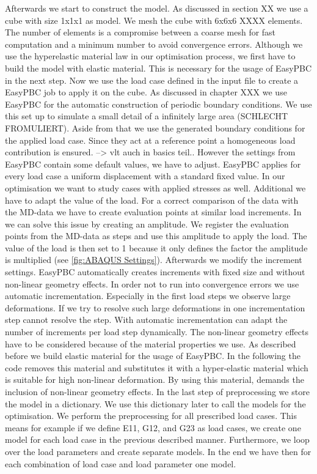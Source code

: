 Afterwards we start to construct the model. As discussed in section XX we use a cube with size 1x1x1 as model. We mesh the cube with 6x6x6 XXXX elements. The number of elements is a compromise between a coarse mesh for fast computation and a minimum number to avoid convergence errors. Although we use the hyperelastic material law in our optimisation process, we first have to build the model with elastic material. This is necessary for the usage of EasyPBC in the next step. Now we use the load case defined in the input file to create a EasyPBC job to apply it on the cube. As discussed in chapter XXX we use EasyPBC for the automatic construction of periodic boundary conditions. We use this set up to simulate a small detail of a infinitely large area (SCHLECHT FROMULIERT). Aside from that we use the generated boundary conditions for the applied load case. Since they act at a reference point a homogeneous load contribution is ensured. --> vlt auch in basics teil..
However the settings from EasyPBC contain some default values, we have to adjust. EasyPBC applies for every load case a uniform displacement with a standard fixed value. In our optimisation we want to study cases with applied stresses as well. Additional we have to adapt the value of the load. For a correct comparison of the  data with the MD-data we have to create evaluation points at similar load increments. In  we can solve this issue by creating an amplitude. We register the evaluation points from the MD-data as steps and use this amplitude to apply the load. The value of the load is then set to 1 because it only defines the factor the amplitude is multiplied (see \autoref{fig:ABAQUS Settings}). Afterwards we modify the increment settings. EasyPBC automatically creates increments with fixed size and without non-linear geometry effects. In order not to run into convergence errors we use automatic incrementation. Especially in the first load steps we observe large deformations. If we try to resolve such large deformations in one incrementation step  cannot resolve the step. With automatic incrementation  can adapt the number of increments per load step dynamically. The non-linear geometry effects have to be considered because of the material properties we use. As described before we build elastic material for the usage of EasyPBC. In the following the code removes this material and substitutes it with a hyper-elastic material which is suitable for high non-linear deformation. By using this material,  demands the inclusion of non-linear geometry effects. In the last step of preprocessing we store the model in a dictionary. We use this dictionary later to call the models for the optimisation. We perform the preprocessing for all prescribed load cases. This means for example if we define E11, G12, and G23 as load cases, we create one model for each load case in the previous described manner. Furthermore, we loop over the load parameters and create separate models. In the end we have then for each combination of load case and load parameter one model. 



